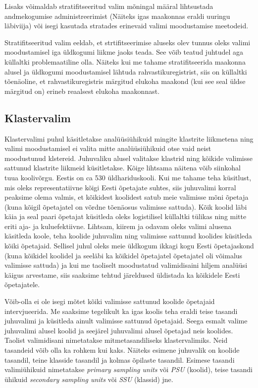\documentclass[
]{book}
\begin{document}
Lisaks võimaldab stratifitseeritud valim mõningal määral lihtsustada andmekogumise administreerimist (Näiteks igas maakonnas eraldi uuringu läbiviija) või isegi kasutada stratades erinevaid valimi moodustamise meetodeid.

Stratifitseeritud valim eeldab, et strtifitseerimise aluseks olev tunnus oleks valimi moodustamisel iga üldkogumi liikme jaoks teada. See võib teatud juhtudel aga küllaltki problemaatiline olla. Näiteks kui me tahame stratifitseerida maakonna alusel ja üldkogumi moodustamisel lähtuda rahvastikuregistrist, siis on küllaltki tõenäoline, et rahvastikuregistris märgitud elukoha maakond (kui see seal üldse märgitud on) erineb reaalsest elukoha maakonnast.

\hypertarget{klastervalim}{%
\subsection{Klastervalim}\label{klastervalim}}

Klastervalimi puhul käsitletakse analüüsiühikuid mingite klastrite liikmetena ning valimi moodustamisel ei valita mitte analüüsiühikuid otse vaid neist moodustunud klstereid. Juhuvaliku alusel valitakse klastrid ning kõikide valimisse sattunud klastrite liikmeid küsitletakse. Kõige lihtsama näitena võib siinkohal tuua koolivõrgu. Eestis on ca 530 üldhariduskooli. Kui me tahame teha küsitlust, mis oleks representatiivne kõigi Eesti õpetajate suhtes, siis juhuvalimi korral peaksime olema valmis, et kõikidest koolidest satub meie valimisse mõni õpetaja (kuna kõigil õpetajatel on võrdne tõenäosus valimisse sattuda). Kõik koolid läbi käia ja seal paari õpetajat küsitleda oleks logistilisel küllaltki tülikas ning mitte eriti aja- ja kuluefektiivne. Lihtsam, kiirem ja odavam oleks valimi alusena käsitleda koole, teha koolide juhuvalim ning valimisse sattunud koolides küsitleda kõiki õpetajaid. Sellisel juhul oleks meie üldkogum ikkagi kogu Eesti õpetajaskond (kuna kõikidel koolidel ja seeläbi ka kõikidel õpetajatel õpetajatel oli võimalus valimisse sattuda) ja kui me taoliselt moodustatud valimidisaini hiljem analüüsi käigus arvestame, siis saaksime tehtud järeldused üldistada ka kõikidele Eesti õpetajatele.

Võib-olla ei ole isegi mõtet kõiki valimisse sattunud koolide õpetajaid intervjueerida. Me saaksime tegelikult ka igas koolis teha eraldi teise tasandi juhuvalimi ja küsitleda ainult valimisse sattunud õpetajaid. Seega esmalt valime juhuvalimi alusel koolid ja seejärel juhuvalimi alusel õpetajad neis koolides. Taolist valimidisani nimetatakse mitmetasandiliseks klastervalimiks. Neid tasandeid võib olla ka rohkem kui kaks. Näiteks esimene juhuvalik on koolide tasandil, teine klasside tasandil ja kolmas õpilaste tasandil. Esimese tasandi valimiühikuid nimetatakse \emph{primary sampling units} või \emph{PSU} (koolid), teise tasandi ühikuid \emph{secondary sampling units } või \emph{SSU} (klassid) jne.
\end{document}
